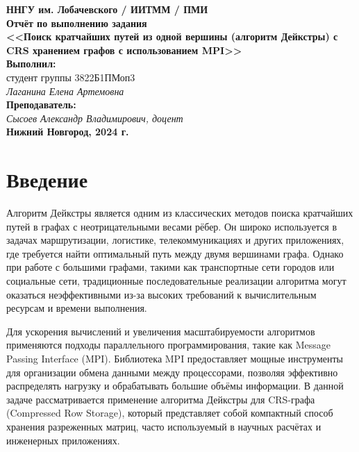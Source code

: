 \documentclass[12pt]{article}
\begin{document}
\begin{titlepage}
    \begin{center}
        \large
        \textbf{ННГУ им. Лобачевского / ИИТММ / ПМИ}\\[0.5cm]

        \vspace{4cm}
        \textbf{\Large Отчёт по выполнению задания}\\
        \textbf{\large <<Поиск кратчайших путей из одной вершины (алгоритм Дейкстры) с CRS хранением графов с использованием MPI>>}\\[3cm]

        \vspace{3cm}
        \textbf{Выполнил:}\\
        студент группы 3822Б1ПМоп3 \\
        \textit{Лаганина Елена Артемовна}\\[1cm]

        \textbf{Преподаватель:}\\
        \textit{Сысоев Александр Владимирович, доцент}\\[2cm]

        \vfill
        \textbf{Нижний Новгород, 2024 г.}
    \end{center}
\end{titlepage}

\section*{Введение}
Алгоритм Дейкстры является одним из классических методов поиска кратчайших путей в графах с неотрицательными весами рёбер. Он широко используется в задачах маршрутизации, логистике, телекоммуникациях и других приложениях, где требуется найти оптимальный путь между двумя вершинами графа. Однако при работе с большими графами, такими как транспортные сети городов или социальные сети, традиционные последовательные реализации алгоритма могут оказаться неэффективными из-за высоких требований к вычислительным ресурсам и времени выполнения.

Для ускорения вычислений и увеличения масштабируемости алгоритмов применяются подходы параллельного программирования, такие как Message Passing Interface (MPI). Библиотека MPI предоставляет мощные инструменты для организации обмена данными между процессорами, позволяя эффективно распределять нагрузку и обрабатывать большие объёмы информации. В данной задаче рассматривается применение алгоритма Дейкстры для CRS-графа (Compressed Row Storage), который представляет собой компактный способ хранения разреженных матриц, часто используемый в научных расчётах и инженерных приложениях.
\newpage
\end{document}
